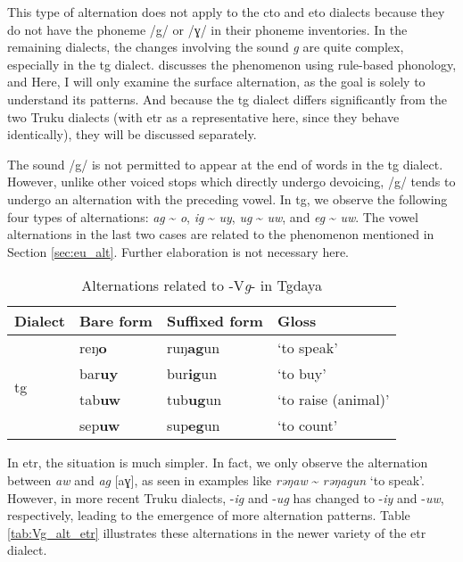 This type of alternation does not apply to the \acl{cto} and \acl{eto} dialects because they do not have the phoneme /g/ or /ɣ/ in their phoneme inventories. In the remaining dialects, the changes involving the sound \textit{g} are quite complex, especially in the \acl{tg} dialect. \textcite[653-57]{yang1976sedpho} discusses the phenomenon using rule-based phonology, and  Here, I will only examine the surface alternation, as the goal is solely to understand its patterns. And because the \acl{tg} dialect differs significantly from the two Truku dialects (with \acl{etr} as a representative here, since they behave identically), they will be discussed separately.

The sound /g/ is not permitted to appear at the end of words in the \acl{tg} dialect. However, unlike other voiced stops which directly undergo devoicing, /g/ tends to undergo an alternation with the preceding vowel. In \acl{tg}, we observe the following four types of alternations: \textit{ag} \~{ } \textit{o}, \textit{ig} \~{ } \textit{uy}, \textit{ug} \~{ } \textit{uw}, and \textit{eg} \~{ } \textit{uw}. The vowel alternations in the last two cases are related to the phenomenon mentioned in Section \ref{sec:eu_alt}. Further elaboration is not necessary here.

\begin{table}[!htbp]
\centering
\caption{Alternations related to -V\textit{g}- in Tgdaya}
\label{tab:Vg_alt_tg}
\begin{tabular}{llll}
\hline
Dialect                   & Bare form      & Suffixed form    & Gloss      \\ \hline
\multirow{4}{*}{\acl{tg}} & reŋ\textbf{o}  & ruŋ\textbf{ag}un & `to speak'          \\
                          & bar\textbf{uy} & bur\textbf{ig}un & `to buy'            \\
                          & tab\textbf{uw} & tub\textbf{ug}un & `to raise (animal)' \\
                          & sep\textbf{uw} & sup\textbf{eg}un & `to count'          \\ \hline
\end{tabular}
\end{table}

In \acl{etr}, the situation is much simpler. In fact, we only observe the alternation between \textit{aw} and \textit{ag} [aɣ], as seen in examples like \textit{rəŋaw} \~{} \textit{rəŋagun} `to speak'. However, in more recent Truku dialects, -\textit{ig} and -\textit{ug} has changed to -\textit{iy} and -\textit{uw}, respectively, leading to the emergence of more alternation patterns. Table \ref{tab:Vg_alt_etr} illustrates these alternations in the newer variety of the \acl{etr} dialect.

